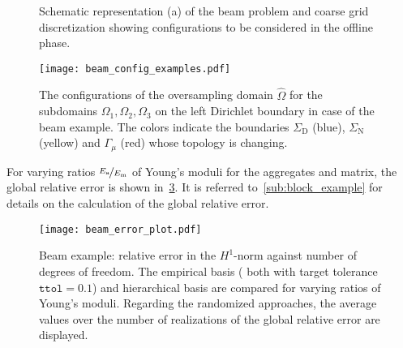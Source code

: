 \documentclass[AMA,STIX1COL,doublespace]{WileyNJD-v2}
\newcommand{\NumReal}{20}
\begin{document}
\begin{figure}[htb]
	\centering
	\hfill
	\caption{Schematic representation (a) of the beam problem and coarse grid discretization showing configurations to be considered in the offline phase.}%
	\label{fig:beam_sketch_config}
\end{figure}

\begin{figure}[tb]
	\centering
	\texttt{[image: beam\_config\_examples.pdf]}
	\caption{The configurations of the oversampling domain $\hat\varOmega$ for the subdomains $\varOmega_1, \varOmega_{2}, \varOmega_{3}$ on the left Dirichlet boundary in case of the beam example. The colors indicate the boundaries $\varSigma_{\mathrm{D}}$ (blue), $\varSigma_{\mathrm{N}}$ (yellow) and $\varGamma_{\mu}$ (red) whose topology is changing.}%
	\label{fig:beam_config_examples}
\end{figure}

For varying ratios $\nicefrac{E_{\mathrm{a}}}{E_{\mathrm{m}}}$ of Young's moduli
for the aggregates and matrix, the global relative error is shown
in~\cref{fig:beam_rel_err}.
It is referred to~\cref{sub:block_example} for details on the calculation of
the global relative error.
\begin{figure}[tb]
	\centering
	\texttt{[image: beam\_error\_plot.pdf]}
    \caption{Beam example:  relative error in the
        $H^1$-norm against number of degrees of freedom.
        The empirical basis ( both with target tolerance $\texttt{ttol}=0.1$) and hierarchical
        basis are compared for varying ratios of Young's moduli.
        Regarding the randomized approaches, the average values over the number of \added{$\NumReal{}$}
        realizations  of the global relative error are displayed.}%
	\label{fig:beam_rel_err}
\end{figure}
\end{document}
